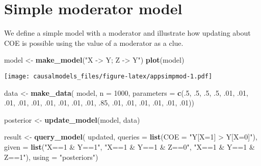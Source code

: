 \documentclass[
  12pt,
]{book}
\newenvironment{Shaded}{\begin{snugshade}}{\end{snugshade}}
\newcommand{\DataTypeTok}[1]{\textcolor[rgb]{0.13,0.29,0.53}{#1}}
\newcommand{\DecValTok}[1]{\textcolor[rgb]{0.00,0.00,0.81}{#1}}
\newcommand{\FloatTok}[1]{\textcolor[rgb]{0.00,0.00,0.81}{#1}}
\newcommand{\KeywordTok}[1]{\textcolor[rgb]{0.13,0.29,0.53}{\textbf{#1}}}
\newcommand{\NormalTok}[1]{#1}
\newcommand{\StringTok}[1]{\textcolor[rgb]{0.31,0.60,0.02}{#1}}
\begin{document}
\hypertarget{simple-moderator-model}{%
\section{Simple moderator model}\label{simple-moderator-model}}

We define a simple model with a moderator and illustrate how updating about COE is possible using the value of a moderator as a clue.

\begin{Shaded}
\begin{Highlighting}[]
\NormalTok{model <-}\StringTok{ }\KeywordTok{make_model}\NormalTok{(}\StringTok{"X -> Y; Z -> Y"}\NormalTok{) }
\KeywordTok{plot}\NormalTok{(model)}
\end{Highlighting}
\end{Shaded}

\texttt{[image: causalmodels\_files/figure-latex/appsimpmod-1.pdf]}

\begin{Shaded}
\begin{Highlighting}[]
\NormalTok{data <-}\StringTok{ }\KeywordTok{make_data}\NormalTok{(}
\NormalTok{    model, }\DataTypeTok{n =} \DecValTok{1000}\NormalTok{, }
    \DataTypeTok{parameters =} \KeywordTok{c}\NormalTok{(.}\DecValTok{5}\NormalTok{, }\FloatTok{.5}\NormalTok{, }\FloatTok{.5}\NormalTok{, }\FloatTok{.5}\NormalTok{, }
                   \FloatTok{.01}\NormalTok{, }\FloatTok{.01}\NormalTok{, }\FloatTok{.01}\NormalTok{, }\FloatTok{.01}\NormalTok{, }\FloatTok{.01}\NormalTok{, }\FloatTok{.01}\NormalTok{, }\FloatTok{.01}\NormalTok{, }\FloatTok{.01}\NormalTok{,}
                   \FloatTok{.01}\NormalTok{, }\FloatTok{.85}\NormalTok{, }\FloatTok{.01}\NormalTok{, }\FloatTok{.01}\NormalTok{, }\FloatTok{.01}\NormalTok{, }\FloatTok{.01}\NormalTok{, }\FloatTok{.01}\NormalTok{, }\FloatTok{.01}\NormalTok{))}
\end{Highlighting}
\end{Shaded}

\begin{Shaded}
\begin{Highlighting}[]
\NormalTok{posterior <-}\StringTok{ }\KeywordTok{update_model}\NormalTok{(model, data)}
\end{Highlighting}
\end{Shaded}

\begin{Shaded}
\begin{Highlighting}[]
\NormalTok{result <-}\StringTok{ }\KeywordTok{query_model}\NormalTok{(}
\NormalTok{    updated, }
    \DataTypeTok{queries =} \KeywordTok{list}\NormalTok{(}\DataTypeTok{COE =} \StringTok{"Y[X=1] > Y[X=0]"}\NormalTok{), }
    \DataTypeTok{given =} \KeywordTok{list}\NormalTok{(}\StringTok{"X==1 & Y==1"}\NormalTok{, }\StringTok{"X==1 & Y==1 & Z==0"}\NormalTok{, }\StringTok{"X==1 & Y==1 & Z==1"}\NormalTok{),}
    \DataTypeTok{using =} \StringTok{"posteriors"}\NormalTok{)}
\end{Highlighting}
\end{Shaded}
\end{document}
